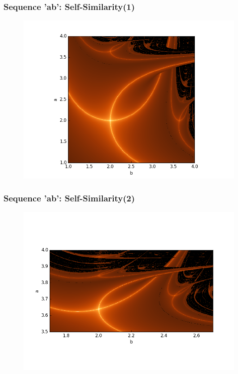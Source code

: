 \documentclass[ignorenonframetext]{beamer}
\begin{document}

\begin{frame}
\frametitle{Sequence 'ab': Self-Similarity(1)}
\begin{figure}[htbp]
\vspace*{5pt}
\includegraphics[scale = 0.5]{pictures/ab_selfsim_1.png}
\end{figure}
\end{frame}

\begin{frame}
\frametitle{Sequence 'ab': Self-Similarity(2)}
\begin{figure}[htbp]
\includegraphics[scale = 0.5]{pictures/ab_selfsim_2.png}
\end{figure}
\end{frame}
\end{document}
